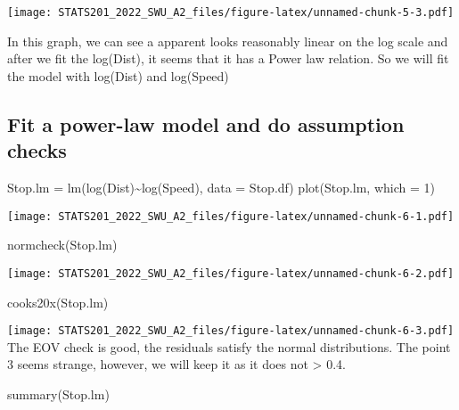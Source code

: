 \documentclass[
]{article}
\newenvironment{Shaded}{\begin{snugshade}}{\end{snugshade}}
\newcommand{\AttributeTok}[1]{\textcolor[rgb]{0.77,0.63,0.00}{#1}}
\newcommand{\DecValTok}[1]{\textcolor[rgb]{0.00,0.00,0.81}{#1}}
\newcommand{\FunctionTok}[1]{\textcolor[rgb]{0.00,0.00,0.00}{#1}}
\newcommand{\NormalTok}[1]{#1}
\newcommand{\OtherTok}[1]{\textcolor[rgb]{0.56,0.35,0.01}{#1}}
\newcommand{\SpecialCharTok}[1]{\textcolor[rgb]{0.00,0.00,0.00}{#1}}
\begin{document}
\texttt{[image: STATS201\_2022\_SWU\_A2\_files/figure-latex/unnamed-chunk-5-3.pdf]}

In this graph, we can see a apparent looks reasonably linear on the log
scale and after we fit the log(Dist), it seems that it has a Power law
relation. So we will fit the model with log(Dist) and log(Speed)

\hypertarget{fit-a-power-law-model-and-do-assumption-checks}{%
\subsection{Fit a power-law model and do assumption
checks}\label{fit-a-power-law-model-and-do-assumption-checks}}

\begin{Shaded}
\begin{Highlighting}[]
\NormalTok{Stop.lm }\OtherTok{=} \FunctionTok{lm}\NormalTok{(}\FunctionTok{log}\NormalTok{(Dist)}\SpecialCharTok{\textasciitilde{}}\FunctionTok{log}\NormalTok{(Speed), }\AttributeTok{data =}\NormalTok{ Stop.df)}
\FunctionTok{plot}\NormalTok{(Stop.lm, }\AttributeTok{which =} \DecValTok{1}\NormalTok{)}
\end{Highlighting}
\end{Shaded}

\texttt{[image: STATS201\_2022\_SWU\_A2\_files/figure-latex/unnamed-chunk-6-1.pdf]}

\begin{Shaded}
\begin{Highlighting}[]
\FunctionTok{normcheck}\NormalTok{(Stop.lm)}
\end{Highlighting}
\end{Shaded}

\texttt{[image: STATS201\_2022\_SWU\_A2\_files/figure-latex/unnamed-chunk-6-2.pdf]}

\begin{Shaded}
\begin{Highlighting}[]
\FunctionTok{cooks20x}\NormalTok{(Stop.lm)}
\end{Highlighting}
\end{Shaded}

\texttt{[image: STATS201\_2022\_SWU\_A2\_files/figure-latex/unnamed-chunk-6-3.pdf]}
The EOV check is good, the residuals satisfy the normal distributions.
The point 3 seems strange, however, we will keep it as it does not
\textgreater{} 0.4.

\begin{Shaded}
\begin{Highlighting}[]
\FunctionTok{summary}\NormalTok{(Stop.lm)}
\end{Highlighting}
\end{Shaded}
\end{document}
